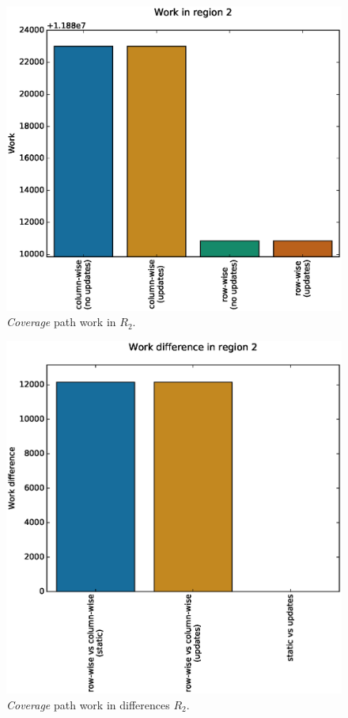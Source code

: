 \documentclass{tamuccthesis}
\begin{document}
\begin{figure}
    \captionsetup{justification=centering}
    \centering
    \includegraphics[width=\textwidth,trim={0cm 0cm 0cm 0.75cm},clip]{work_r2.eps}
    \caption{\textit{Coverage} path work in $R_2$.}
    \label{fig:coverage_noterrain_work_r2}
\end{figure}
\begin{figure}
    \captionsetup{justification=centering}
    \centering
    \includegraphics[width=\textwidth,trim={0cm 0cm 0cm 0.75cm},clip]{diff_r2.eps}
    \caption{\textit{Coverage} path work in differences $R_2$.}
    \label{fig:coverage_noterrain_diff_r2}
\end{figure}
\end{document}
